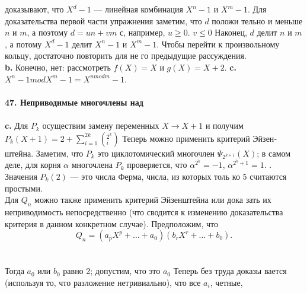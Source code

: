\documentclass{../../template/mai_book}
\begin{document}
{\begin{eqnarray}
			\end{eqnarray}\\
доказывают, что $X^{d} - 1$ --- линейная комбинация $X^{n} - 1$ и $X^{m} - 1$.\linebreak
Для доказательства первой части упражнения заметим, что $d$ положи­\linebreak
тельно и меньше $n$ и $m$, а поэтому $d = un + vm$ с, например,  $u \geq 0$.\linebreak
$v \leq 0$  Наконец, $d$ делит $n$ и $m$, а потому $X^{d} - 1$ делит $X^{n} - 1$ и $X^{m} - 1$.\linebreak
Чтобы перейти к произвольному кольцу, достаточно повторить для не­\linebreak
го предыдущие рассуждения.\\
\hspace*{15pt}\textbf{b.} Конечно, нет: рассмотреть $f(X) = X$ и $g(X) = X + 2$.
\hspace*{15pt}\textbf{c.} $X^{n} - 1 mod X^{m} - 1 = X^{n mod m} - 1$.\\
\\
\noindent\textbf{47. Неприводимые многочлены над} \\
\\
\hspace*{15pt}\textbf{c.} Для $P_k$ осуществим замену переменных $X \rightarrow X + 1$ и получим\linebreak
$P_k(X + 1) = 2 + \sum^{2k}_{i=1}(^{2^{k}}_i) $ Теперь можно применить критерий Эйзен­\linebreak
штейна. Заметим, что $P_k$ это циклотомический многочлен $\Psi_{2^{k+1}}(X)$;\linebreak
в самом деле, для корня $\alpha$ многочлена $P_k$ проверяется, что $\alpha^{2^{k}} = -1$,\linebreak
$\alpha^{2^{k} + 1} = 1$. . Значения $P_k(2)$ ---  это числа Ферма, числа, из которых толь­\linebreak
ко 5 считаются простыми.\\
\hspace*{15pt} Для $Q_n$  можно также применить критерий Эйзенштейна или дока­
зать их неприводимость непосредственно (что сводится к изменению
доказательства критерия в данном конкретном случае). Предположим,
что
$$Q_n = (a_{p}X^{p} +\ldots+a_0)(b_{r}X^{r}+\ldots+ b_0).$$\\
\\
Тогда $a_0$ или $b_0$ равно 2; допустим, что это $a_0$ Теперь без труда доказы­
вается (используя то, что разложение нетривиально), что все $a_i$, четные,
}
\end{document}
